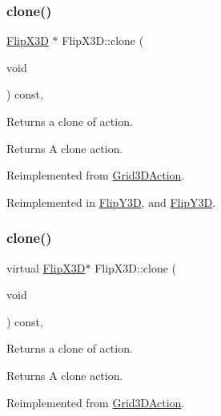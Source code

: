 \subsubsection{\texorpdfstring{clone()}{clone()}\hspace{0.1cm}{\footnotesize\ttfamily [1/2]}}
{\footnotesize\ttfamily \hyperlink{classFlipX3D}{Flip\+X3D} $\ast$ Flip\+X3\+D\+::clone (\begin{DoxyParamCaption}\item[{void}]{ }\end{DoxyParamCaption}) const\hspace{0.3cm}{\ttfamily [override]}, {\ttfamily [virtual]}}

Returns a clone of action.

\begin{DoxyReturn}{Returns}
A clone action. 
\end{DoxyReturn}


Reimplemented from \hyperlink{classGrid3DAction_a01d5b2d60654ef66d6551ac2190ed14c}{Grid3\+D\+Action}.



Reimplemented in \hyperlink{classFlipY3D_a4553fc238ade03f1926ba12458ad073b}{Flip\+Y3D}, and \hyperlink{classFlipY3D_a797e0c0669bd83473d66dc8d77d49daa}{Flip\+Y3D}.

\mbox{\label{classFlipX3D_a82c67645ce0cfa6435a7266c00359a94}} 
\subsubsection{\texorpdfstring{clone()}{clone()}\hspace{0.1cm}{\footnotesize\ttfamily [2/2]}}
{\footnotesize\ttfamily virtual \hyperlink{classFlipX3D}{Flip\+X3D}$\ast$ Flip\+X3\+D\+::clone (\begin{DoxyParamCaption}\item[{void}]{ }\end{DoxyParamCaption}) const\hspace{0.3cm}{\ttfamily [override]}, {\ttfamily [virtual]}}

Returns a clone of action.

\begin{DoxyReturn}{Returns}
A clone action. 
\end{DoxyReturn}


Reimplemented from \hyperlink{classGrid3DAction_a01d5b2d60654ef66d6551ac2190ed14c}{Grid3\+D\+Action}.



